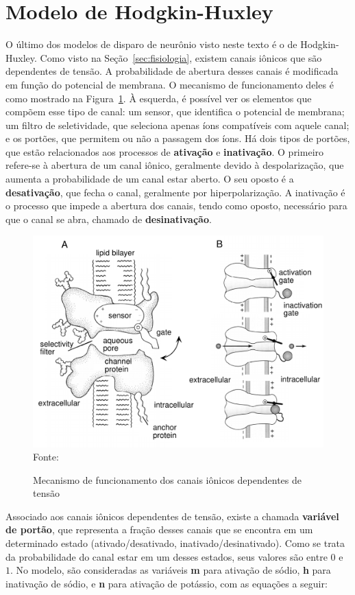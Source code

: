 \section{Modelo de Hodgkin-Huxley}\label{sec:modelohh}
O último dos modelos de disparo de neurônio visto neste texto é o de Hodgkin-Huxley.
Como visto na Seção~\ref{sec:fisiologia}, existem canais iônicos que são dependentes de tensão. A probabilidade de abertura desses canais é modificada em função do potencial de membrana. O mecanismo de funcionamento deles é como mostrado na Figura~\ref{fig:canais}. À esquerda, é possível ver os elementos que compõem esse tipo de canal: um sensor, que identifica o potencial de membrana; um filtro de seletividade, que seleciona apenas íons compatíveis com aquele canal; e os portões, que permitem ou não a passagem dos íons. Há dois tipos de portões, que estão relacionados aos processos de \textbf{ativação} e \textbf{inativação}. O primeiro refere-se à abertura de um canal iônico, geralmente devido à despolarização, que aumenta a probabilidade de um canal estar aberto. O seu oposto é a \textbf{desativação}, que fecha o canal, geralmente por hiperpolarização. A inativação é o processo que impede a abertura dos canais, tendo como oposto, necessário para que o canal se abra, chamado de \textbf{desinativação}.
\cite{miller_introductory_2018}
\begin{figure}[htb!]
	\centering
	\caption{Mecanismo de funcionamento dos canais iônicos dependentes de tensão}
	\label{fig:canais}
	\includegraphics[width=0.6\linewidth]{figs/canais}\\
	\small{Fonte: \cite{dayan_theoretical_2001}}
\end{figure}
Associado aos canais iônicos dependentes de tensão, existe a chamada \textbf{variável de portão}, que representa a fração desses canais que se encontra em um determinado estado (ativado/desativado, inativado/desinativado). Como se trata da probabilidade do canal estar em um desses estados, seus valores são entre $0$ e $1$. No modelo, são consideradas as variáveis \textbf{m} para ativação de sódio, \textbf{h} para inativação de sódio, e \textbf{n} para ativação de potássio, com as equações a seguir:

